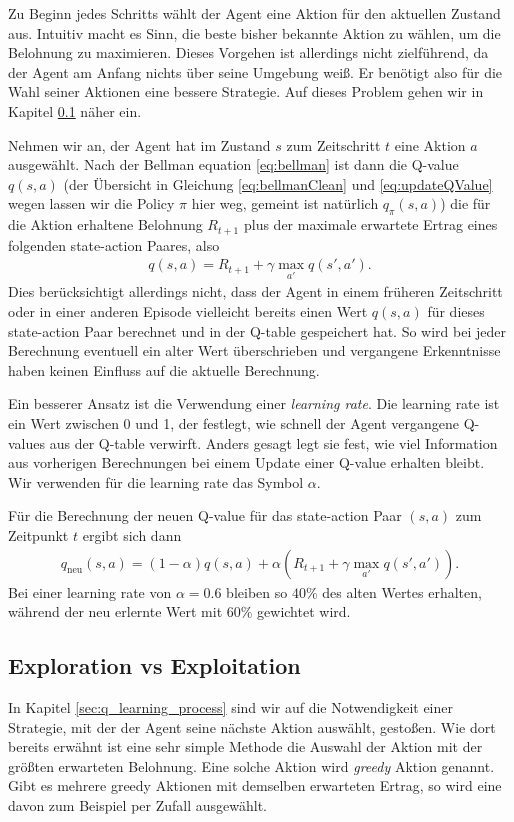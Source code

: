 Zu Beginn jedes Schritts wählt der Agent eine Aktion für den aktuellen Zustand aus. Intuitiv macht es Sinn, die beste bisher bekannte Aktion zu wählen, um die Belohnung zu maximieren. Dieses Vorgehen ist allerdings nicht zielführend, da der Agent am Anfang nichts über seine Umgebung weiß. Er benötigt also für die Wahl seiner Aktionen eine bessere Strategie. Auf dieses Problem gehen wir in Kapitel \ref{sec:exploration_exploitation} näher ein.

Nehmen wir an, der Agent hat im Zustand $ s $ zum Zeitschritt $ t $ eine Aktion $ a $ ausgewählt. Nach der Bellman equation \ref{eq:bellman} ist dann die Q-value $ q(s, a) $ (der Übersicht in Gleichung \ref{eq:bellmanClean} und \ref{eq:updateQValue} wegen lassen wir die Policy $ \pi $ hier weg, gemeint ist natürlich $ q_\pi(s, a) $) die für die Aktion erhaltene Belohnung $ R_{t + 1} $ plus der maximale erwartete Ertrag eines folgenden state-action Paares, also
\begin{align}
    q(s, a) = R_{t + 1} + \gamma \max_{a'} q(s', a'). \label{eq:bellmanClean}
\end{align}
Dies berücksichtigt allerdings nicht, dass der Agent in einem früheren Zeitschritt oder in einer anderen Episode vielleicht bereits einen Wert $ q(s, a) $ für dieses state-action Paar berechnet und in der Q-table gespeichert hat. So wird bei jeder Berechnung eventuell ein alter Wert überschrieben und vergangene Erkenntnisse haben keinen Einfluss auf die aktuelle Berechnung.

Ein besserer Ansatz ist die Verwendung einer \textit{learning rate}. Die learning rate ist ein Wert zwischen 0 und 1, der festlegt, wie schnell der Agent vergangene Q-values aus der Q-table verwirft. Anders gesagt legt sie fest, wie viel Information aus vorherigen Berechnungen bei einem Update einer Q-value erhalten bleibt. Wir verwenden für die learning rate das Symbol $ \alpha $.

Für die Berechnung der neuen Q-value für das state-action Paar $ (s, a) $ zum Zeitpunkt $ t $ ergibt sich dann
\begin{align}
    q_\text{neu}(s, a) = (1 - \alpha) q(s, a) + \alpha \left(R_{t + 1} + \gamma \max_{a'} q(s', a') \right). \label{eq:updateQValue}
\end{align}
Bei einer learning rate von $ \alpha = 0.6 $ bleiben so $ 40\% $ des alten Wertes erhalten, während der neu erlernte Wert mit $ 60\% $ gewichtet wird.

\subsection{Exploration vs Exploitation} \label{sec:exploration_exploitation}
In Kapitel \ref{sec:q_learning_process} sind wir auf die Notwendigkeit einer Strategie, mit der der Agent seine nächste Aktion auswählt, gestoßen. Wie dort bereits erwähnt ist eine sehr simple Methode die Auswahl der Aktion mit der größten erwarteten Belohnung. Eine solche Aktion wird \textit{greedy} Aktion genannt. Gibt es mehrere greedy Aktionen mit demselben erwarteten Ertrag, so wird eine davon zum Beispiel per Zufall ausgewählt.

